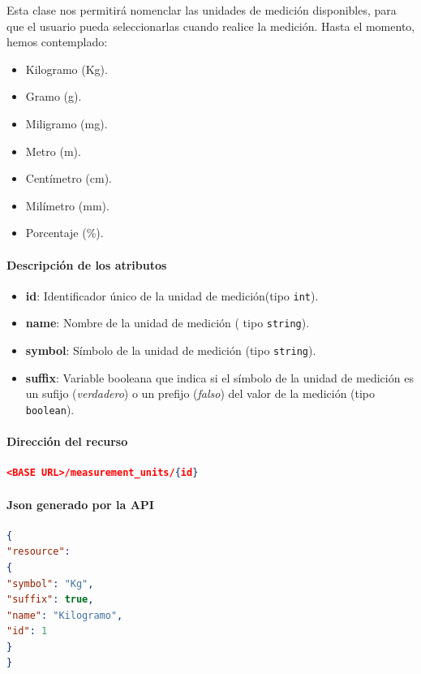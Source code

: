 Esta clase nos permitirá nomenclar las unidades de medición disponibles, para que el usuario pueda seleccionarlas cuando realice la medición.
Hasta el momento, hemos contemplado:
\begin{itemize}
	\item Kilogramo (Kg).
	\item Gramo (g).
	\item Miligramo (mg).
	\item Metro (m).
	\item Centímetro (cm).
	\item Milímetro (mm).
	\item Porcentaje (\%).
\end{itemize}

\paragraph{Descripción de los atributos}
\begin{itemize}
	\item \textbf{id}: Identificador único de la unidad de medición(tipo \texttt{int}).
	\item \textbf{name}: Nombre de la unidad de medición ( tipo \texttt{string}).
	\item \textbf{symbol}: Símbolo de la unidad de medición (tipo \texttt{string}).
	\item \textbf{suffix}: Variable booleana que indica si el símbolo de la unidad de medición es un sufijo (\textit{verdadero}) o un prefijo (\textit{falso}) del valor de la medición (tipo \texttt{boolean}).
\end{itemize}

\paragraph{Dirección del recurso}
\begin{lstlisting}[language=json,firstnumber=1]
<BASE URL>/measurement_units/{id}
\end{lstlisting}

\paragraph{Json generado por la API} 
\begin{lstlisting}[language=json,firstnumber=1]
{
"resource": 
{
"symbol": "Kg",
"suffix": true,
"name": "Kilogramo",
"id": 1
}
}
\end{lstlisting}


